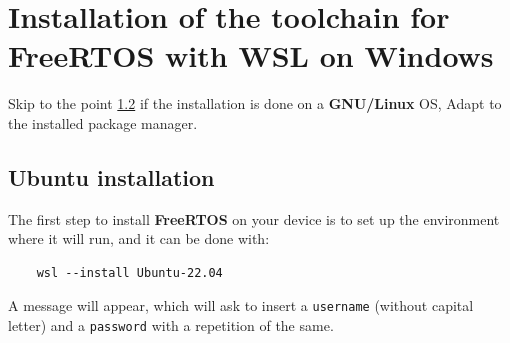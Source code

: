 \documentclass{exam}
\begin{document}
\begin{titlepage}
	\center 



 

 
	\LoggaSwe     


 
 
	\vfill
\end{titlepage}

\pagebreak


\section{Installation of the toolchain for FreeRTOS with WSL on Windows}
Skip to the point \hyperref[1.2]{1.2} if the installation is done on a \textbf{GNU/Linux} OS, Adapt to the installed package manager.
\subsection{Ubuntu installation}
The first step to install \textbf{FreeRTOS} on your device is to set up the environment where it will run, and it can be done with:

\begin{lstlisting}
    wsl --install Ubuntu-22.04
\end{lstlisting}

A message will appear, which will ask to insert a \texttt{username} (without capital letter) and a \texttt{password} with a repetition of the same.

\end{document}
